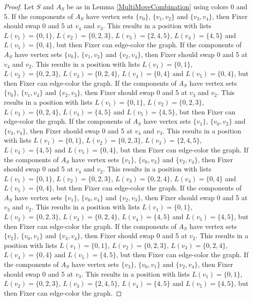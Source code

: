 \documentclass[12pt]{amsart}
\theoremstyle{plain}
\theoremstyle{definition}
\theoremstyle{remark}
\begin{document}
\begin{proof}
Let $S$ and $A_S$ be as in Lemma \ref{MultiMoveCombination} using colors $0$ and $5$. If the components of $A_S$ have vertex sets $\{v_0\}$, $\{v_1, v_2\}$ and $\{v_3, v_4\}$, then Fixer should swap 0 and 5 at $v_4$ and $v_3$. This results in a position with lists $L(v_1) = \{0, 1\}$, $L(v_2) = \{0, 2, 3\}$, $L(v_3) = \{2, 4, 5\}$, $L(v_4) = \{4, 5\}$ and $L(v_5) = \{0, 4\}$, but then Fixer can edge-color the graph.
If the components of $A_S$ have vertex sets $\{v_0\}$, $\{v_1, v_3\}$ and $\{v_2, v_4\}$, then Fixer should swap 0 and 5 at $v_4$ and $v_2$. This results in a position with lists $L(v_1) = \{0, 1\}$, $L(v_2) = \{0, 2, 3\}$, $L(v_3) = \{0, 2, 4\}$, $L(v_4) = \{0, 4\}$ and $L(v_5) = \{0, 4\}$, but then Fixer can edge-color the graph.
If the components of $A_S$ have vertex sets $\{v_0\}$, $\{v_1, v_4\}$ and $\{v_2, v_3\}$, then Fixer should swap 0 and 5 at $v_3$ and $v_2$. This results in a position with lists $L(v_1) = \{0, 1\}$, $L(v_2) = \{0, 2, 3\}$, $L(v_3) = \{0, 2, 4\}$, $L(v_4) = \{4, 5\}$ and $L(v_5) = \{4, 5\}$, but then Fixer can edge-color the graph.
If the components of $A_S$ have vertex sets $\{v_1\}$, $\{v_0, v_2\}$ and $\{v_3, v_4\}$, then Fixer should swap 0 and 5 at $v_4$ and $v_3$. This results in a position with lists $L(v_1) = \{0, 1\}$, $L(v_2) = \{0, 2, 3\}$, $L(v_3) = \{2, 4, 5\}$, $L(v_4) = \{4, 5\}$ and $L(v_5) = \{0, 4\}$, but then Fixer can edge-color the graph.
If the components of $A_S$ have vertex sets $\{v_1\}$, $\{v_0, v_3\}$ and $\{v_2, v_4\}$, then Fixer should swap 0 and 5 at $v_4$ and $v_2$. This results in a position with lists $L(v_1) = \{0, 1\}$, $L(v_2) = \{0, 2, 3\}$, $L(v_3) = \{0, 2, 4\}$, $L(v_4) = \{0, 4\}$ and $L(v_5) = \{0, 4\}$, but then Fixer can edge-color the graph.
If the components of $A_S$ have vertex sets $\{v_1\}$, $\{v_0, v_4\}$ and $\{v_2, v_3\}$, then Fixer should swap 0 and 5 at $v_3$ and $v_2$. This results in a position with lists $L(v_1) = \{0, 1\}$, $L(v_2) = \{0, 2, 3\}$, $L(v_3) = \{0, 2, 4\}$, $L(v_4) = \{4, 5\}$ and $L(v_5) = \{4, 5\}$, but then Fixer can edge-color the graph.
If the components of $A_S$ have vertex sets $\{v_2\}$, $\{v_0, v_1\}$ and $\{v_3, v_4\}$, then Fixer should swap 0 and 5 at $v_2$. This results in a position with lists $L(v_1) = \{0, 1\}$, $L(v_2) = \{0, 2, 3\}$, $L(v_3) = \{0, 2, 4\}$, $L(v_4) = \{0, 4\}$ and $L(v_5) = \{4, 5\}$, but then Fixer can edge-color the graph.
If the components of $A_S$ have vertex sets $\{v_3\}$, $\{v_0, v_1\}$ and $\{v_2, v_4\}$, then Fixer should swap 0 and 5 at $v_3$. This results in a position with lists $L(v_1) = \{0, 1\}$, $L(v_2) = \{0, 2, 3\}$, $L(v_3) = \{2, 4, 5\}$, $L(v_4) = \{4, 5\}$ and $L(v_5) = \{4, 5\}$, but then Fixer can edge-color the graph.

\end{proof}
\end{document}
